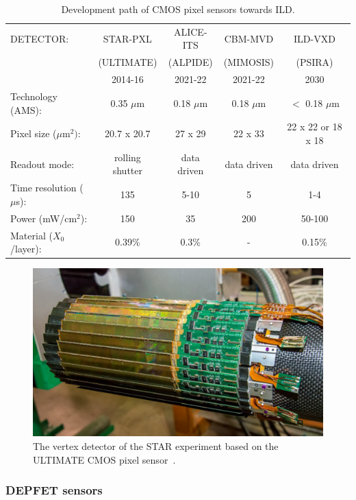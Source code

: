 \begin{table}\hspace*{-0cm}\small
\begin{tabular}{ l c c c c }
\toprule
DETECTOR: & STAR-PXL & ALICE-ITS & CBM-MVD & ILD-VXD \\
& (ULTIMATE) & (ALPIDE) & (MIMOSIS) & (PSIRA) \\
& 2014-16 & 2021-22 & 2021-22   & 2030 \\
\midrule
Technology (AMS): & 0.35 $\mu$m & 0.18 $\mu$m & 0.18 $\mu$m & $<$ 0.18 $\mu$m \\
Pixel size ($\mu$m$^2)$: & 20.7 x 20.7  & 27 x 29 & 22 x 33 & 22 x 22 or 18 x 18 \\
Readout mode:   & rolling shutter & data driven & data driven & data driven \\
Time resolution ($\mu$s):   & 135 & 5-10 & 5 & 1-4 \\
Power (mW/cm$^2$):   & 150 & 35  & 200  & 50-100 \\
Material ($X_0$/layer):   & 0.39\% & 0.3\%  & - & 0.15\% \\
\bottomrule
\end{tabular}
\caption{\label{ild:tab:CMOSdev}Development path of CMOS pixel sensors towards ILD.}
\end{table}



\begin{figure}[t!]
\centering
\includegraphics[width=0.6\hsize]{Detector/fig/VTX_STAR.png}
\caption{The vertex detector of the STAR experiment based on the ULTIMATE CMOS pixel sensor~\cite{Contin:2017mck}.}
\label{fig:det:VTX_STAR}
\end{figure}

\subsubsection{DEPFET sensors}

